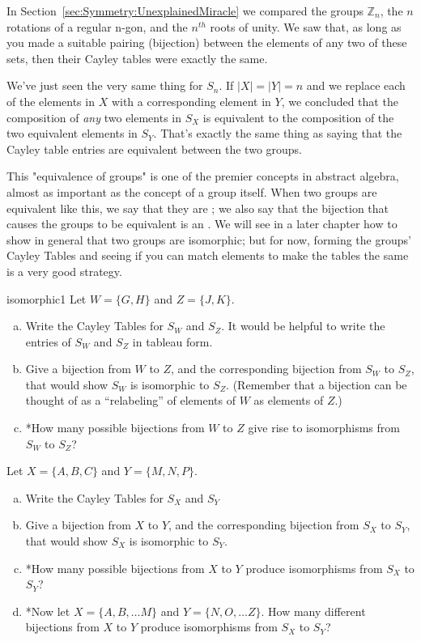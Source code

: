 In Section~\ref{sec:Symmetry:UnexplainedMiracle} we compared the groups $\mathbb{Z}_n$, the $n$ rotations of a regular n-gon, and the $n^{th}$ roots of unity.  We saw that, as long as you made a suitable pairing (bijection) between the elements of any two of these sets, then their Cayley tables were exactly the same. 

We've just seen the very same thing for $S_n$. If  $|X| = |Y| = n$ and we replace each of the elements in $X$ with a corresponding element in $Y$, we concluded that the composition of \emph{any} two elements in $S_X$ is equivalent to the composition of the two equivalent elements in $S_Y$.  That's exactly the same thing as saying that  the Cayley table entries are equivalent between the two groups.

This "equivalence of groups" is one of the premier concepts in abstract algebra, almost as important as the concept of a group  itself.  When two groups are equivalent like this, we say that they are ; we also say that the bijection that causes the groups to be equivalent is an .  We will see in a later chapter how to show in general that two groups are isomorphic; but for now, forming the groups' Cayley Tables and seeing if you can match elements to make the tables the same is a very good strategy.

\begin{exercise}{isomorphic1}
Let $W =\{G, H \}$ and $Z = \{J, K \}$.
\begin{enumerate}[(a)]
\item
Write the Cayley Tables for $S_W$ and $S_Z$. It would be helpful to write the entries of $S_W$ and $S_Z$ in tableau form. 
\item
Give a bijection from $W$ to $Z$, and the corresponding bijection from $S_W$ to $S_Z$, that would show $S_W$ is isomorphic to $S_Z$. (Remember that a bijection can be thought of as  a ``relabeling'' of elements of $W$ as elements of $Z$.)
\item
*How many possible bijections from $W$ to $Z$ give rise to isomorphisms from  $S_W$ to  $S_Z$?
\end{enumerate}
\end{exercise}


\begin{exercise}{11}
Let $X =\{A, B, C\}$ and $Y = \{M, N, P\}$.
\begin{enumerate}[(a)]
\item
Write the Cayley Tables for $S_X$ and $S_Y$
\item
Give a bijection from $X$ to $Y$, and the corresponding bijection from $S_X$ to $S_Y$, that would show $S_X$ is isomorphic to $S_Y$.
\item
*How many possible bijections from $X$ to $Y$ produce isomorphisms from $S_X$ to $S_Y$?
\item
*Now let $X =\{A, B, \ldots M\}$ and $Y = \{N, O, \ldots Z\}$. How many different bijections from $X$ to $Y$ produce isomorphisms from $S_X$ to $S_Y$?

\end{enumerate}
\end{exercise}


